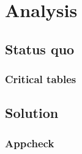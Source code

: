 
\chapter*{Analysis}
\label{ch:Analysis}
\section{Status quo}
\subsection{Critical tables}
\section{Solution}
\subsection{Appcheck}